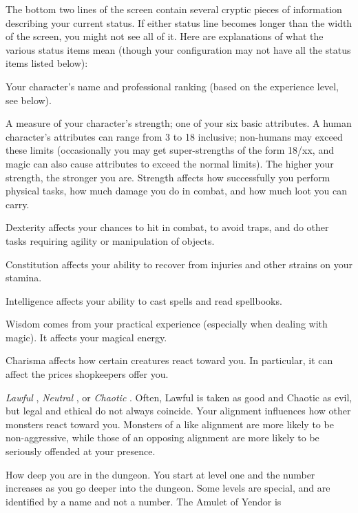 The bottom two lines of the screen contain several cryptic pieces of
information describing your current status.  If either status line
becomes longer than the width of the screen, you might not see all of
it.  Here are explanations of what the various status items mean
(though your configuration may not have all the status items listed
below):
\blist{}
\item[\bb{"Rank  "}]
Your character's name and professional ranking (based on the
experience level, see below).
\item[\bb{Strength}]
A measure of your character's strength; one of your six basic
attributes.  A human character's attributes can range from 3 to 18 inclusive;
non-humans may exceed these limits
(occasionally you may get super-strengths of the form 18/xx, and magic can
also cause attributes to exceed the normal limits).  The
higher your strength, the stronger you are.  Strength affects how
successfully you perform physical tasks, how much damage you do in
combat, and how much loot you can carry.
\item[\bb{Dexterity}]
Dexterity affects your chances to hit in combat, to avoid traps, and
do other tasks requiring agility or manipulation of objects.
\item[\bb{Constitution}]
Constitution affects your ability to recover from injuries and other
strains on your stamina.
\item[\bb{Intelligence}]
Intelligence affects your ability to cast spells and read spellbooks.
\item[\bb{Wisdom}]
Wisdom comes from your practical experience (especially when dealing with
magic).  It affects your magical energy.
\item[\bb{Charisma}]
Charisma affects how certain creatures react toward you.  In
particular, it can affect the prices shopkeepers offer you.
\item[\bb{Alignment}]
%
{\it  Lawful}%
, %
{\it  Neutral}%
, or %
{\it  Chaotic}%
.  Often, Lawful is
taken as good and Chaotic as evil, but legal and ethical do not always
coincide.  Your alignment influences how other
monsters react toward you.  Monsters of a like alignment are more likely
to be non-aggressive, while those of an opposing alignment are more likely
to be seriously offended at your presence.
\item[\bb{Dungeon Level}]
How deep you are in the dungeon.  You start at level one and the number
increases as you go deeper into the dungeon.  Some levels are special,
and are identified by a name and not a number.  The Amulet of Yendor is
